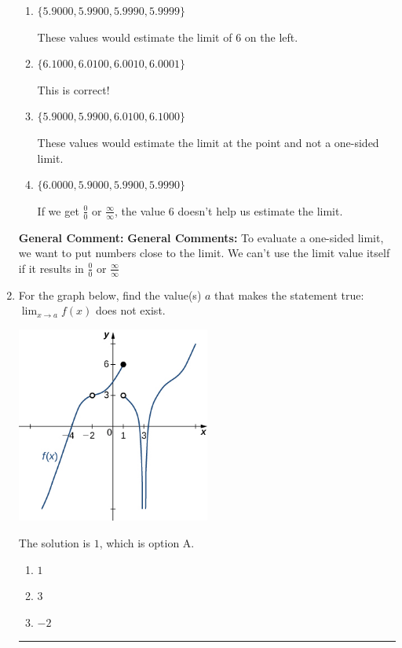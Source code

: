 \documentclass{extbook}[14pt]
\newcommand{\litem}[1]{\item #1

\rule{\textwidth}{0.4pt}}
\begin{document}
\begin{enumerate}
{\begin{enumerate}[label=\Alph*.]
If we get $\frac{0}{0}$ or $\frac{\infty}{\infty}$, the value 6 doesn't help us estimate the limit.
\item \( \{ 5.9000, 5.9900, 5.9990, 5.9999 \} \)

These values would estimate the limit of 6 on the left.
\item \( \{ 6.1000, 6.0100, 6.0010, 6.0001 \} \)

This is correct!
\item \( \{ 5.9000, 5.9900, 6.0100, 6.1000 \} \)

These values would estimate the limit at the point and not a one-sided limit.
\item \( \{ 6.0000, 5.9000, 5.9900, 5.9990 \} \)

If we get $\frac{0}{0}$ or $\frac{\infty}{\infty}$, the value 6 doesn't help us estimate the limit.
\end{enumerate}

\textbf{General Comment:} \textbf{General Comments:} To evaluate a one-sided limit, we want to put numbers close to the limit. We can't use the limit value itself if it results in $\frac{0}{0}$ or $\frac{\infty}{\infty}$
}
\litem{
For the graph below, find the value(s) $a$ that makes the statement true: $ \displaystyle \lim_{x \rightarrow a} f(x)$ does not exist.

\begin{center}
    \includegraphics[width=0.5\textwidth]{../Figures/evaluateLimitGraphicallyB.png}
\end{center}


The solution is \( 1 \), which is option A.\begin{enumerate}[label=\Alph*.]
\item \( 1 \)


\item \( 3 \)


\item \( -2 \)



\end{enumerate}}
\end{enumerate}
\end{document}
